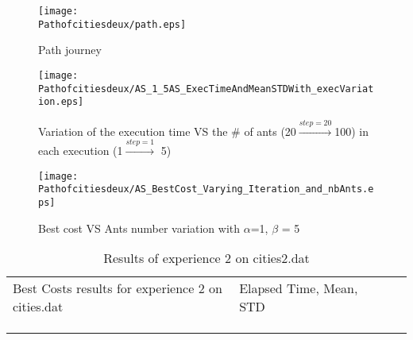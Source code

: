 \begin{figure}[H]
	\begin{minipage}[t]{0.45\linewidth}
	\centering
	\texttt{[image: \\Pathofcitiesdeux/path.eps]}
	\caption{Path journey}\label{fig:Pathofcitiesdeux:path}
	
	\end{minipage}\hfill
	\begin{minipage}[t]{0.45\linewidth}
	\centering
	\texttt{[image: \\Pathofcitiesdeux/AS\_1\_5AS\_ExecTimeAndMeanSTDWith\_execVariation.eps]}
	\caption{Variation of the execution time VS the \# of ants (20$\stackrel{step=20}{\rightarrow}$100) in each execution (1$\stackrel{step=1}{\rightarrow}$ 5)}
	\label{fig:Pathofcitiesdeux:AS_1_5AS_ExecTimeAndMeanSTDWith_execVariation}
	\end{minipage}
	\flushleft
	\begin{minipage}[t]{0.45\linewidth}
	\centering
	\texttt{[image: \\Pathofcitiesdeux/AS\_BestCost\_Varying\_Iteration\_and\_nbAnts.eps]}
	\caption{Best cost VS Ants number variation with $\alpha$=1, $ \beta $ = 5}
	\label{fig:Pathofcitiesdeux:AS_BestCost_Varying_Iteration_and_nbAnts}
	\end{minipage}
\end{figure}\flushright
	\begin{minipage}[t]{0.9\linewidth}
	\vspace{-9mm}
	\begin{table}[H]
	\label{tab:Pathofcitiesdeux:expdeux}
	\begin{tabular}{lllll}
	\cline{1-2}
	\multicolumn{1}{|l|}{Best Costs results for experience 2 on cities.dat }                                                           &  \multicolumn{1}{l|}{Elapsed Time, Mean, STD}                                             &  &  &  \\ \cline{1-2}
	\multicolumn{1}{|l|}{} & \multicolumn{1}{l|}{ } &  &  &  \\ \cline{1-2}
	&     &  &  &  \\
	&     &  &  & 
	\end{tabular}
	\caption{Results of experience 2 on cities2.dat}
	\end{table}
	\end{minipage}